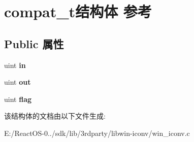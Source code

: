 \hypertarget{structcompat__t}{}\section{compat\+\_\+t结构体 参考}
\label{structcompat__t}
\subsection*{Public 属性}
\begin{DoxyCompactItemize}
\item 
\mbox{\label{structcompat__t_aab528ea28f82cb1e07f8047a2e5cba9d}} 
uint {\bfseries in}
\item 
\mbox{\label{structcompat__t_a2f5b3119fa908e46662bbbc3b7871a0a}} 
uint {\bfseries out}
\item 
\mbox{\label{structcompat__t_aa88e2afd0ab0fc0acbfd12cdf3831662}} 
uint {\bfseries flag}
\end{DoxyCompactItemize}


该结构体的文档由以下文件生成\+:\begin{DoxyCompactItemize}
\item 
E\+:/\+React\+O\+S-\/0../sdk/lib/3rdparty/libwin-\/iconv/win\+\_\+iconv.\+c\end{DoxyCompactItemize}
